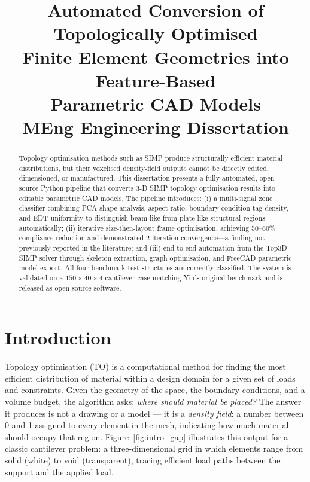 \documentclass[11pt,a4paper]{article}
\title{\textbf{Automated Conversion of Topologically Optimised\\
Finite Element Geometries into Feature-Based\\
Parametric CAD Models}\\[4pt]
\large MEng Engineering Dissertation}
\author{}
\date{}
\begin{document}
\maketitle

\begin{abstract}
Topology optimisation methods such as SIMP produce structurally efficient
material distributions, but their voxelised density-field outputs cannot be
directly edited, dimensioned, or manufactured.
This dissertation presents a fully automated, open-source Python pipeline that
converts 3-D SIMP topology optimisation results into editable parametric CAD
models.
The pipeline introduces: (i) a multi-signal zone classifier combining PCA shape
analysis, aspect ratio, boundary condition tag density, and EDT uniformity to
distinguish beam-like from plate-like structural regions automatically;
(ii) iterative size-then-layout frame optimisation, achieving 50--60\%
compliance reduction and demonstrated 2-iteration convergence---a finding not
previously reported in the literature; and
(iii) end-to-end automation from the Top3D SIMP solver through skeleton
extraction, graph optimisation, and FreeCAD parametric model export.
All four benchmark test structures are correctly classified.
The system is validated on a $150 \times 40 \times 4$ cantilever case matching
Yin's \cite{yin2020} original benchmark and is released as open-source software.
\end{abstract}

\section{Introduction}
\label{sec:intro}

Topology optimisation (TO) is a computational method for finding the most
efficient distribution of material within a design domain for a given set of
loads and constraints.
Given the geometry of the space, the boundary conditions, and a volume budget,
the algorithm asks: \emph{where should material be placed?}
The answer it produces is not a drawing or a model --- it is a \emph{density
field}: a number between 0 and 1 assigned to every element in the mesh,
indicating how much material should occupy that region.
Figure~\ref{fig:intro_gap} illustrates this output for a classic cantilever
problem: a three-dimensional grid in which elements range from solid (white)
to void (transparent), tracing efficient load paths between the support and
the applied load.
\end{document}
